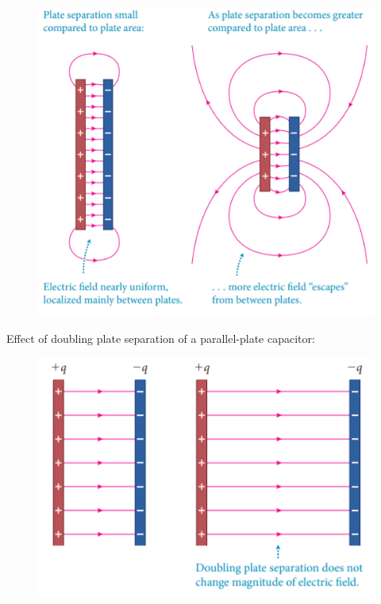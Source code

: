         \begin{figure}[hbt!]
            \centering
            \includegraphics[scale = 0.75]{Resources/26.2_Separation}
        \end{figure}

        Effect of doubling plate separation of a parallel-plate capacitor:

        \begin{figure}[hbt!]
            \centering
            \includegraphics[scale = 0.75]{Resources/26.2_Doubling_Separation}
        \end{figure}

